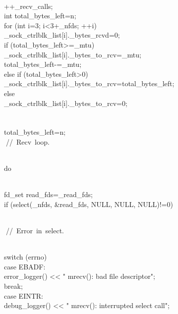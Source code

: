 \documentclass{article}
\begin{document}
 {
\\
         ++_recv_calls;
\\
         int total_bytes_left=n;
\\
         for (int i=3; i<3+_nfds; ++i) {
\\
                 _sock_ctrlblk_list[i]._bytes_rcvd=0;
\\
                 if (total_bytes_left>=_mtu) {
\\
                         _sock_ctrlblk_list[i]._bytes_to_rcv=_mtu;
\\
                         total_bytes_left-=_mtu;
\\
                 } else if (total_bytes_left>0) {
\\
                         _sock_ctrlblk_list[i]._bytes_to_rcv=total_bytes_left;
\\
                 } else {
\\
                         _sock_ctrlblk_list[i]._bytes_to_rcv=0;
\\
                 }
\\
         }
\\
         total_bytes_left=n;
\\
         
\hbox{// Recv loop.}\strut\\
         do {
\\
                 fd_set read_fds=_read_fds;
\\
                 if (select(_nfds, &read_fds, NULL, NULL, NULL)!=0) {
\\
                         
\hbox{// Error in select.}\strut\\
                         switch (errno) {
\\
                         case EBADF:
\\
                                 error_logger() << "    mrecv(): bad file descriptor\n";
\\
                                 break;
\\
                         case EINTR:
\\
                                 debug_logger() << "    mrecv(): interrupted select call\n";
}}}}
\end{document}
